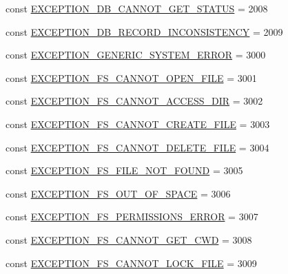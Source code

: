 \begin{DoxyCompactItemize}
\item 
const \hyperlink{class_database_exception_a078837d5b35b669c158aa3cc2c0e2a9f}{E\+X\+C\+E\+P\+T\+I\+O\+N\+\_\+\+D\+B\+\_\+\+C\+A\+N\+N\+O\+T\+\_\+\+G\+E\+T\+\_\+\+S\+T\+A\+T\+U\+S} = 2008
\item 
const \hyperlink{class_database_exception_aa49625b4d6d958dd9dff0969725eec8b}{E\+X\+C\+E\+P\+T\+I\+O\+N\+\_\+\+D\+B\+\_\+\+R\+E\+C\+O\+R\+D\+\_\+\+I\+N\+C\+O\+N\+S\+I\+S\+T\+E\+N\+C\+Y} = 2009
\item 
const \hyperlink{class_database_exception_ac2b0baa16c6c435065699e0606272706}{E\+X\+C\+E\+P\+T\+I\+O\+N\+\_\+\+G\+E\+N\+E\+R\+I\+C\+\_\+\+S\+Y\+S\+T\+E\+M\+\_\+\+E\+R\+R\+O\+R} = 3000
\item 
const \hyperlink{class_database_exception_a460f308cd80a87c48d51ac54e61b37bc}{E\+X\+C\+E\+P\+T\+I\+O\+N\+\_\+\+F\+S\+\_\+\+C\+A\+N\+N\+O\+T\+\_\+\+O\+P\+E\+N\+\_\+\+F\+I\+L\+E} = 3001
\item 
const \hyperlink{class_database_exception_a4cde73367b61f571c353362002618265}{E\+X\+C\+E\+P\+T\+I\+O\+N\+\_\+\+F\+S\+\_\+\+C\+A\+N\+N\+O\+T\+\_\+\+A\+C\+C\+E\+S\+S\+\_\+\+D\+I\+R} = 3002
\item 
const \hyperlink{class_database_exception_ada70b9523f11c2115e75b0c1298b7b95}{E\+X\+C\+E\+P\+T\+I\+O\+N\+\_\+\+F\+S\+\_\+\+C\+A\+N\+N\+O\+T\+\_\+\+C\+R\+E\+A\+T\+E\+\_\+\+F\+I\+L\+E} = 3003
\item 
const \hyperlink{class_database_exception_ab8908292d329eb19e5e2a01e65efec4a}{E\+X\+C\+E\+P\+T\+I\+O\+N\+\_\+\+F\+S\+\_\+\+C\+A\+N\+N\+O\+T\+\_\+\+D\+E\+L\+E\+T\+E\+\_\+\+F\+I\+L\+E} = 3004
\item 
const \hyperlink{class_database_exception_aba74a043f93aff28bf7d913d64504889}{E\+X\+C\+E\+P\+T\+I\+O\+N\+\_\+\+F\+S\+\_\+\+F\+I\+L\+E\+\_\+\+N\+O\+T\+\_\+\+F\+O\+U\+N\+D} = 3005
\item 
const \hyperlink{class_database_exception_a1d7160b183812594679877046c3fd62a}{E\+X\+C\+E\+P\+T\+I\+O\+N\+\_\+\+F\+S\+\_\+\+O\+U\+T\+\_\+\+O\+F\+\_\+\+S\+P\+A\+C\+E} = 3006
\item 
const \hyperlink{class_database_exception_aa1ed10447564eb986514790822a1516c}{E\+X\+C\+E\+P\+T\+I\+O\+N\+\_\+\+F\+S\+\_\+\+P\+E\+R\+M\+I\+S\+S\+I\+O\+N\+S\+\_\+\+E\+R\+R\+O\+R} = 3007
\item 
const \hyperlink{class_database_exception_a40d50055804a9019ed22faec53b5f7ca}{E\+X\+C\+E\+P\+T\+I\+O\+N\+\_\+\+F\+S\+\_\+\+C\+A\+N\+N\+O\+T\+\_\+\+G\+E\+T\+\_\+\+C\+W\+D} = 3008
\item 
const \hyperlink{class_database_exception_ac5a6423e46a25c86b58d3f6fb5b55c9d}{E\+X\+C\+E\+P\+T\+I\+O\+N\+\_\+\+F\+S\+\_\+\+C\+A\+N\+N\+O\+T\+\_\+\+L\+O\+C\+K\+\_\+\+F\+I\+L\+E} = 3009

\end{DoxyCompactItemize}
